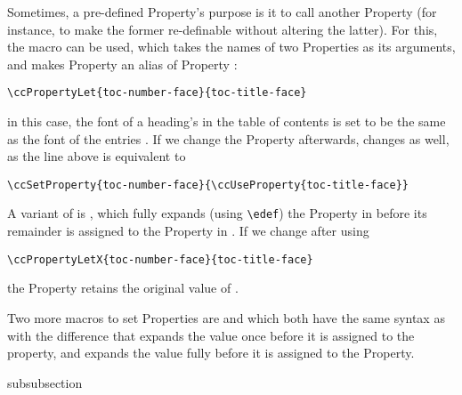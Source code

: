 Sometimes, a pre-defined Property's purpose is it to call another
Property (for instance, to make the former re-definable without
altering the latter). For this, the macro
\DeclareMacro{\ccPropertyLet} can be used, which takes the names of
two Properties as its arguments, and makes Property  an
alias of Property :
\begin{lstlisting}
\ccPropertyLet{toc-number-face}{toc-title-face}
\end{lstlisting}
in this case, the font of a heading's  in the
table of contents is set to be the same as the font of the entries
. If we change the
 Property afterwards,
 changes as well, as the line above is
equivalent to
\begin{lstlisting}
\ccSetProperty{toc-number-face}{\ccUseProperty{toc-title-face}}
\end{lstlisting}
A variant of \UsageMacro{\ccPropertyLet} is
\DeclareMacro{\ccPropertyLetX}, which fully expands (using
\lstinline{\edef}) the Property in  before its remainder
is assigned to the Property in . If we change
 after using
\begin{lstlisting}
\ccPropertyLetX{toc-number-face}{toc-title-face}
\end{lstlisting}
the Property  retains the original
value of .

Two more macros to set Properties are
\DeclareMacro{\ccSetPropVal} and \DeclareMacro{\ccSetPropertyX}
which both have the same syntax as \UsageMacro{\ccSetProperty} with
the difference that \UsageMacro{\ccSetPropVal} expands the value
once before it is assigned to the property, and
\UsageMacro{\ccSetPropertyX} expands the value fully before it is
assigned to the Property.




\begin{Heading}{subsubsection}
\end{Heading}

